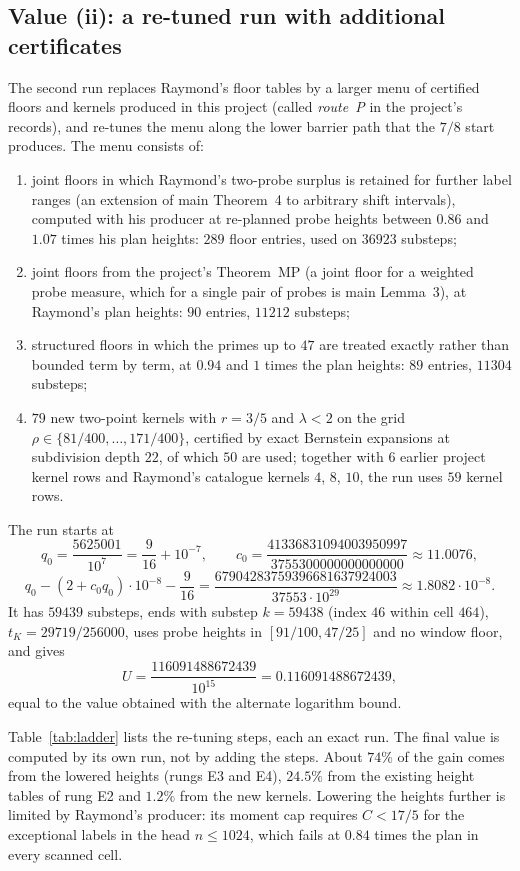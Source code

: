 \documentclass[11pt]{article}
\theoremstyle{definition}
\begin{document}
\subsection{Value (ii): a re-tuned run with additional certificates}\label{sec:run2}

The second run replaces Raymond's floor tables by a larger menu of certified floors and
kernels produced in this project (called \emph{route~P} in the project's records), and
re-tunes the menu along the lower barrier path that the $7/8$ start produces. The menu
consists of:
\begin{enumerate}[label=(M\arabic*),leftmargin=2.6em]
\item joint floors in which Raymond's two-probe surplus is retained for further label ranges
(an extension of main Theorem~4 to arbitrary shift intervals), computed with his producer
at re-planned probe heights between $0.86$ and $1.07$ times his plan heights: $289$ floor
entries, used on $36923$ substeps;
\item joint floors from the project's Theorem~MP (a joint floor for a weighted probe measure,
which for a single pair of probes is main Lemma~3), at Raymond's plan heights: $90$ entries,
$11212$ substeps;
\item structured floors in which the primes up to $47$ are treated exactly rather than
bounded term by term, at $0.94$ and $1$ times the plan heights: $89$ entries, $11304$
substeps;
\item $79$ new two-point kernels with $r=3/5$ and $\lambda<2$ on the grid
$\rho\in\{81/400,\dots,171/400\}$, certified by exact Bernstein expansions at subdivision
depth $22$, of which $50$ are used; together with $6$ earlier project kernel rows and
Raymond's catalogue kernels $4$, $8$, $10$, the run uses $59$ kernel rows.
\end{enumerate}
The run starts at
\[
q_0=\frac{5625001}{10^7}=\frac9{16}+10^{-7},\qquad
c_0=\frac{41336831094003950997}{3755300000000000000}\approx11.0076,
\]
\[
q_0-(2+c_0q_0)\cdot10^{-8}-\frac9{16}=\frac{67904283759396681637924003}{37553\cdot10^{29}}\approx1.8082\cdot10^{-8}.
\]
It has $59439$ substeps, ends with substep $k=59438$ (index $46$ within cell $464$),
$t_K=29719/256000$, uses probe heights in
$[91/100,47/25]$ and no window floor, and gives
\[
U=\frac{116091488672439}{10^{15}}=0.116091488672439,
\]
equal to the value obtained with the alternate logarithm bound.

Table~\ref{tab:ladder} lists the re-tuning steps, each an exact run. The final value is
computed by its own run, not by adding the steps. About $74\%$ of the gain comes from the
lowered heights (rungs E3 and E4), $24.5\%$ from the existing height tables of rung E2 and
$1.2\%$ from the new kernels. Lowering the heights further is limited by Raymond's producer:
its moment cap requires $C<17/5$ for the exceptional labels in the head $n\le1024$, which
fails at $0.84$ times the plan in every scanned cell.
\end{document}

